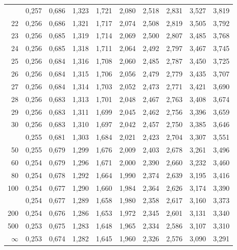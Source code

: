 \documentclass[12pt,a4paper]{article}
\begin{document}
\begin{center}
\begin{tabular*}{\linewidth}{@{\extracolsep{\fill}}rrrrrrrrrr@{}}
\addlinespace[2pt]
21 & 0,257 & 0,686 & 1,323 & 1,721 & 2,080 & 2,518 & 2,831 & 3,527 & 3,819 \\
22 & 0,256 & 0,686 & 1,321 & 1,717 & 2,074 & 2,508 & 2,819 & 3,505 & 3,792 \\
23 & 0,256 & 0,685 & 1,319 & 1,714 & 2,069 & 2,500 & 2,807 & 3,485 & 3,768 \\
24 & 0,256 & 0,685 & 1,318 & 1,711 & 2,064 & 2,492 & 2,797 & 3,467 & 3,745 \\
25 & 0,256 & 0,684 & 1,316 & 1,708 & 2,060 & 2,485 & 2,787 & 3,450 & 3,725 \\
26 & 0,256 & 0,684 & 1,315 & 1,706 & 2,056 & 2,479 & 2,779 & 3,435 & 3,707 \\
27 & 0,256 & 0,684 & 1,314 & 1,703 & 2,052 & 2,473 & 2,771 & 3,421 & 3,690 \\
28 & 0,256 & 0,683 & 1,313 & 1,701 & 2,048 & 2,467 & 2,763 & 3,408 & 3,674 \\
29 & 0,256 & 0,683 & 1,311 & 1,699 & 2,045 & 2,462 & 2,756 & 3,396 & 3,659 \\
30 & 0,256 & 0,683 & 1,310 & 1,697 & 2,042 & 2,457 & 2,750 & 3,385 & 3,646 \\
\addlinespace[2pt]
40 & 0,255 & 0,681 & 1,303 & 1,684 & 2,021 & 2,423 & 2,704 & 3,307 & 3,551 \\
50 & 0,255 & 0,679 & 1,299 & 1,676 & 2,009 & 2,403 & 2,678 & 3,261 & 3,496 \\
60 & 0,254 & 0,679 & 1,296 & 1,671 & 2,000 & 2,390 & 2,660 & 3,232 & 3,460 \\
80 & 0,254 & 0,678 & 1,292 & 1,664 & 1,990 & 2,374 & 2,639 & 3,195 & 3,416 \\
100 & 0,254 & 0,677 & 1,290 & 1,660 & 1,984 & 2,364 & 2,626 & 3,174 & 3,390 \\
\addlinespace[2pt]
120 & 0,254 & 0,677 & 1,289 & 1,658 & 1,980 & 2,358 & 2,617 & 3,160 & 3,373 \\
200 & 0,254 & 0,676 & 1,286 & 1,653 & 1,972 & 2,345 & 2,601 & 3,131 & 3,340 \\
500 & 0,253 & 0,675 & 1,283 & 1,648 & 1,965 & 2,334 & 2,586 & 3,107 & 3,310 \\
$\infty$ & 0,253 & 0,674 & 1,282 & 1,645 & 1,960 & 2,326 & 2,576 & 3,090 & 3,291 \\
\bottomrule
\end{tabular*}
\end{center}

\clearpage
\end{document}

